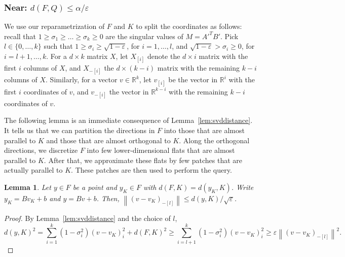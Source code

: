 \documentclass[a4paper,11pt]{paper}
\newcommand{\mathset}[1]{\ensuremath {\mathbb {#1}}}
\newcommand{\eps}{\varepsilon}
\newcommand{\R}{\mathset{R}}
\newtheorem{lemma}[theorem]{Lemma}
\begin{document}
\subsubsection{Near: $d(F, Q) \leq \alpha/\eps$}\label{sec:close}

We use our reparametrization of $F$ and $K$ to split the coordinates
as follows: recall that
$1 \geq \sigma_1 \geq \dots \geq \sigma_k \geq 0$ are the singular
values of $M = A'^TB'$. Pick $l \in \{0, \dots, k\}$ such that
$1 \geq \sigma_i \geq \sqrt{1-\eps}$, for $i = 1, \dots, l$, and
$\sqrt{1-\eps} > \sigma_i \geq 0$, for $i = l+1, \dots, k$.
For a $d \times k$ matrix $X$, let
$X_{[i]}$ denote the $d \times i$ matrix with the first $i$
columns of $X$, and $X_{-[i]}$ the $d \times (k-i)$ matrix with
the remaining $k-i$ columns of $X$.
Similarly, for a vector $v \in \R^k$, let
$v_{[i]}$ be the vector in $\R^i$ with the  first $i$
coordinates of $v$, and $v_{-[i]}$ the vector in $\R^{k-i}$ with the
remaining $k-i$ coordinates of $v$.

The following lemma is an immediate consequence of
Lemma~\ref{lem:svddistance}. It tells us that
we can partition the directions in $F$ into those that are
almost parallel to $K$ and those that are almost orthogonal
to $K$. Along the orthogonal directions, we discretize
$F$ into few lower-dimensional flats that are almost
parallel to $K$. After that, we approximate these flats
by few patches that are actually parallel to $K$.
These patches are then used to perform the query.

\begin{lemma}\label{lem:orthogDiag}
  Let $y \in F$ be a point and
  $y_K \in F$ with  $d(F, K) = d(y_K, K)$.
  Write $y_K = Bv_K + b$ and $y = Bv + b$.
  Then, $\left\|(v - v_K)_{-[l]}\right\| \leq d(y, K)/\sqrt{\eps}$.
\end{lemma}
\begin{proof}
  By Lemma~\ref{lem:svddistance} and the choice of $l$,
  \[
    d(y, K)^2 =
    \sum_{i = 1}^k \left(1-\sigma_i^2\right) (v - v_K)_i^2 + d(F, K)^2
    \geq
    \sum_{i = l+1}^k \left(1-\sigma_i^2\right) (v - v_K)_i^2
    \geq
      \eps \left\|(v - v_K)_{-[l]}\right\|^2.
    \]
\end{proof}
\end{document}

